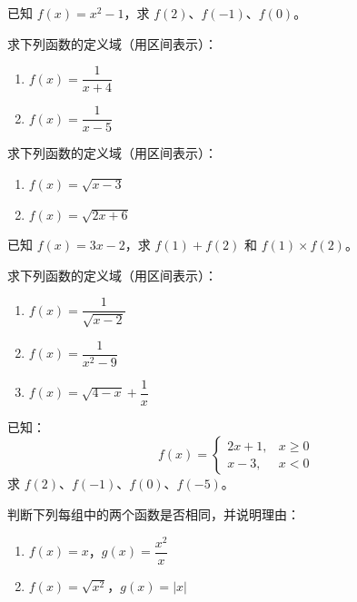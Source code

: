 \begin{exercise}[0]
已知 \(f(x) = x^2 - 1\)，求 \(f(2)\)、\(f(-1)\)、\(f(0)\)。
\end{exercise}


\begin{exercise}[1]
求下列函数的定义域（用区间表示）：
\begin{enumerate}
  \item[(1)] \(f(x) = \dfrac{1}{x + 4}\)
  \item[(2)] \(f(x) = \dfrac{1}{x - 5}\)
\end{enumerate}
\end{exercise}

\begin{exercise}[1]
求下列函数的定义域（用区间表示）：
\begin{enumerate}
  \item[(1)] \(f(x) = \sqrt{x - 3}\)
  \item[(2)] \(f(x) = \sqrt{2x + 6}\)
\end{enumerate}
\end{exercise}

\begin{exercise}[1]
已知 \(f(x) = 3x - 2\)，求 \(f(1) + f(2)\) 和 \(f(1) \times f(2)\)。
\end{exercise}


\begin{exercise}[2]
求下列函数的定义域（用区间表示）：
\begin{enumerate}
  \item[(1)] \(f(x) = \dfrac{1}{\sqrt{x - 2}}\)
  \item[(2)] \(f(x) = \dfrac{1}{x^2 - 9}\)
  \item[(3)] \(f(x) = \sqrt{4 - x} + \dfrac{1}{x}\)
\end{enumerate}
\end{exercise}

\begin{exercise}[2]
已知：
\[
f(x) =
\begin{cases}
2x + 1, & x \ge 0 \\
x - 3,  & x < 0
\end{cases}
\]
求 \(f(2)\)、\(f(-1)\)、\(f(0)\)、\(f(-5)\)。
\end{exercise}

\begin{exercise}[2]
判断下列每组中的两个函数是否相同，并说明理由：
\begin{enumerate}
  \item[(1)] \(f(x) = x\)，\(g(x) = \dfrac{x^2}{x}\)
  \item[(2)] \(f(x) = \sqrt{x^2}\)，\(g(x) = |x|\)
\end{enumerate}
\end{exercise}

